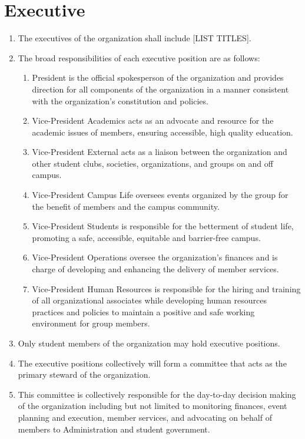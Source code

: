 \documentclass[12pt]{article}
\begin{document}
\section{Executive}
\begin{enumerate}[{4}.1]
    \item The executives of the organization shall include [LIST TITLES].
    \item The broad responsibilities of each executive position are as follows:
    \begin{enumerate}[{4.2}.1]
        \item	President is the official spokesperson of the organization and provides direction for all components of the organization in a manner consistent with the organization’s constitution and policies.
        \item	Vice-President Academics acts as an advocate and resource for the academic issues of members, ensuring accessible, high quality education.
        \item	Vice-President External acts as a liaison between the organization and other student clubs, societies, organizations, and groups on and off campus. 
        \item	Vice-President Campus Life oversees events organized by the group for the benefit of members and the campus community. 
        \item	Vice-President Students is responsible for the betterment of student life, promoting a safe, accessible, equitable and barrier-free campus.
        \item	Vice-President Operations oversee the organization’s finances and is charge of developing and enhancing the delivery of member services. 
        \item	Vice-President Human Resources is responsible for the hiring and training of all organizational associates while developing human resources practices and policies to maintain a positive and safe working environment for group members.
    \end{enumerate}
    \item Only student members of the organization may hold executive positions. 
    \item The executive positions collectively will form a committee that acts as the primary steward of the organization.
    \item This committee is collectively responsible for the day-to-day decision making of the organization including but not limited to monitoring finances, event planning and execution, member services, and advocating on behalf of members to Administration and student government. 

\end{enumerate}
\end{document}

